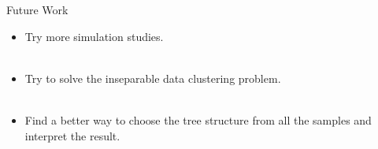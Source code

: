 \documentclass[10 pt]{beamer}
\begin{document}
\begin{frame}{Future Work}
\begin{itemize}
	\item Try more simulation studies.
		~\\
	~\\
	\item Try to solve the inseparable data clustering problem.
		~\\
	~\\
	\item Find a better way to choose the tree structure from all the samples and interpret the result.
	\end{itemize}
\end{frame}
\end{document}
